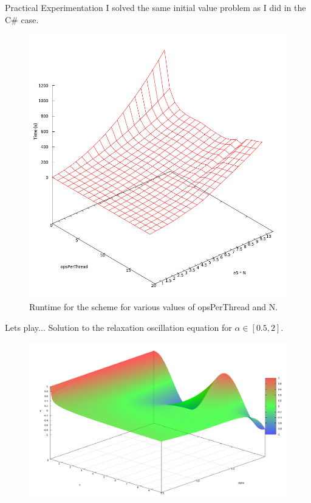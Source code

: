 \documentclass[pdf]{beamer}
\begin{document}
\begin{frame}{Practical Experimentation}
I solved the same initial value problem as I did in the C\# case. 
\begin{figure}[H]
\includegraphics[scale = 0.2]{../images/CUDA_Performance_No_Label}
\caption{Runtime for the scheme for various values of opsPerThread and N.}
\label{fig:cuda_performance_surface}
\end{figure}

\end{frame}

\begin{frame}{Lets play...}
Solution to the relaxation oscillation equation for $ \alpha \in [0.5, 2] $.
\begin{figure}[H]
\includegraphics[scale = 0.2]{../images/FDE_Solution_Surface_No_Label}
\end{figure}
\end{frame}
\end{document}
